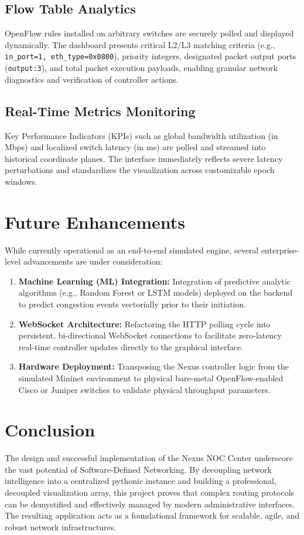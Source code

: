 \documentclass[12pt,a4paper]{article}
\begin{document}
\subsection{Flow Table Analytics}
OpenFlow rules installed on arbitrary switches are securely polled and displayed dynamically. The dashboard presents critical L2/L3 matching criteria (e.g., \texttt{in\_port=1, eth\_type=0x0800}), priority integers, designated packet output ports (\texttt{output:3}), and total packet execution payloads, enabling granular network diagnostics and verification of controller actions.

\subsection{Real-Time Metrics Monitoring}
Key Performance Indicators (KPIs) such as global bandwidth utilization (in Mbps) and localized switch latency (in ms) are polled and streamed into historical coordinate planes. The interface immediately reflects severe latency perturbations and standardizes the visualization across customizable epoch windows.

\section{Future Enhancements}
While currently operational as an end-to-end simulated engine, several enterprise-level advancements are under consideration:
\begin{enumerate}
    \item \textbf{Machine Learning (ML) Integration:} Integration of predictive analytic algorithms (e.g., Random Forest or LSTM models) deployed on the backend to predict congestion events vectorially prior to their initiation.
    \item \textbf{WebSocket Architecture:} Refactoring the HTTP polling cycle into persistent, bi-directional WebSocket connections to facilitate zero-latency real-time controller updates directly to the graphical interface.
    \item \textbf{Hardware Deployment:} Transposing the Nexus controller logic from the simulated Mininet environment to physical bare-metal OpenFlow-enabled Cisco or Juniper switches to validate physical throughput parameters.
\end{enumerate}

\section{Conclusion}
The design and successful implementation of the Nexus NOC Center underscore the vast potential of Software-Defined Networking. By decoupling network intelligence into a centralized pythonic instance and building a professional, decoupled visualization array, this project proves that complex routing protocols can be demystified and effectively managed by modern administrative interfaces. The resulting application acts as a foundational framework for scalable, agile, and robust network infrastructures.
\end{document}
